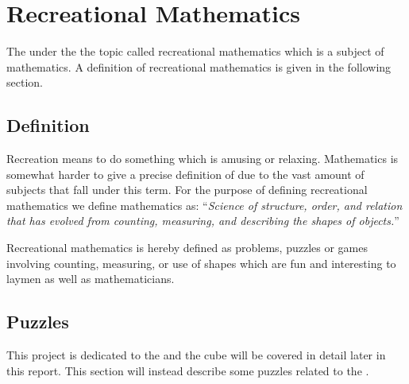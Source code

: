\chapter{Recreational Mathematics}
\label{chap:recreationalMathematics}
The \rubik{} under the the topic called recreational mathematics which is a subject of mathematics.
A definition of recreational mathematics is given in the following section.
\section{Definition}
Recreation means to do something which is amusing or relaxing. Mathematics is somewhat harder to give a precise definition of due to the vast amount of subjects that fall under this term.
For the purpose of defining recreational mathematics we define mathematics as:
``\emph{Science of structure, order, and relation that has evolved from counting, measuring, and describing the shapes of objects.}''\cite{mathDef2}

Recreational mathematics is hereby defined as problems, puzzles or games involving counting, measuring, or use of shapes which are fun and interesting to laymen as well as mathematicians. \cite{Singmaster98} \cite[p. 18]{Trigg78}
\section{Puzzles}
This project is dedicated to the \rubik{} and the cube will be covered in detail later in this report. This section will instead describe some puzzles related to the \rubik{}.

	 
	 
	 
	
